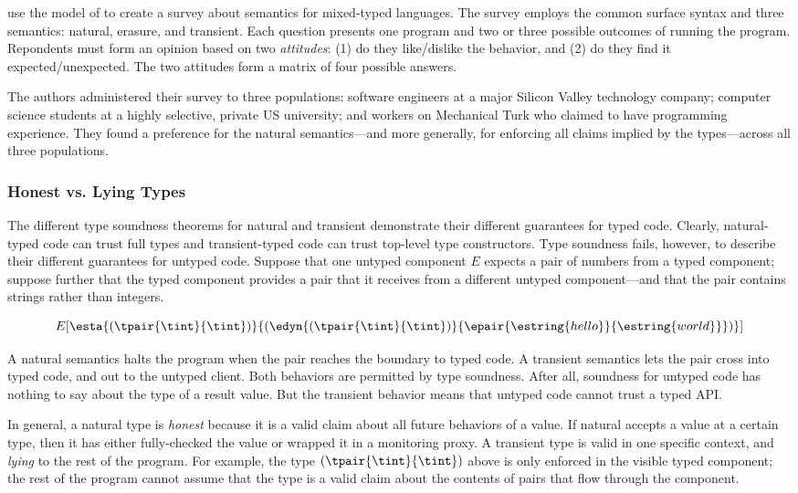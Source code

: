 \citet{tgpk-dls-2018} use the model of \citet{gf-icfp-2018} to create a survey about semantics
 for mixed-typed languages.
The survey employs the common surface syntax and three semantics:
 natural, erasure, and transient.
Each question presents one program and two or three possible outcomes of running
 the program.
Repondents must form an opinion based on two \emph{attitudes}:
 (1) do they like/dislike the behavior,
 and (2) do they find it expected/unexpected.
The two attitudes form a matrix of four possible answers.

The authors administered their survey to three populations:
 software engineers at a major Silicon Valley technology company;
 computer science students at a highly selective, private US university;
 and workers on Mechanical Turk who claimed to have programming experience.
They found a preference for the natural semantics---and more generally,
 for enforcing all claims implied by the types---across all three populations.


\subsubsection{Honest vs. Lying Types}

The different type soundness theorems for natural and transient
 demonstrate their different guarantees for typed code.
Clearly, natural-typed code can trust full types and transient-typed code
 can trust top-level type constructors.
Type soundness fails, however, to describe their different guarantees for
 untyped code.
Suppose that one untyped component $E$ expects a pair of numbers from a
 typed component;
 suppose further that the typed component provides a pair that it receives
 from a different untyped component---and that the pair contains strings
 rather than integers.

\[
  E[\esta{(\tpair{\tint}{\tint})}{(\edyn{(\tpair{\tint}{\tint})}{\epair{\estring{hello}}{\estring{world}}})}]
\]

\noindent
A natural semantics halts the program when the pair reaches the boundary to
 typed code.
A transient semantics lets the pair cross into typed code, and out to the
 untyped client.
Both behaviors are permitted by type soundness.
After all, soundness for untyped code has nothing to say about the type of a
 result value.
But the transient behavior means that untyped code cannot trust a typed
 API.

In general, a natural type is \emph{honest}\/ because it is a valid
 claim about all future behaviors of a value.
If natural accepts a value at a certain type, then it has either fully-checked
 the value or wrapped it in a monitoring proxy.
A transient type is valid in one specific context, and \emph{lying}\/
 to the rest of the program.
For example, the type $(\tpair{\tint}{\tint})$ above is only enforced in
 the visible typed component; the rest of the program cannot assume that the
 type is a valid claim about the contents of pairs that flow through the component.

